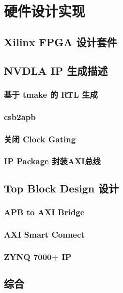 \chapter{硬件设计实现}\label{chap:hardware}

\section{Xilinx FPGA 设计套件}

\section{NVDLA IP 生成描述}

\subsection{基于 tmake 的 RTL 生成}

\subsection{csb2apb}

\subsection{关闭 Clock Gating}

\subsection{IP Package 封装AXI总线}

\section{Top Block Design 设计}

\subsection{APB to AXI Bridge}

\subsection{AXI Smart Connect}

\subsection{ZYNQ 7000+ IP}

\section{综合}

